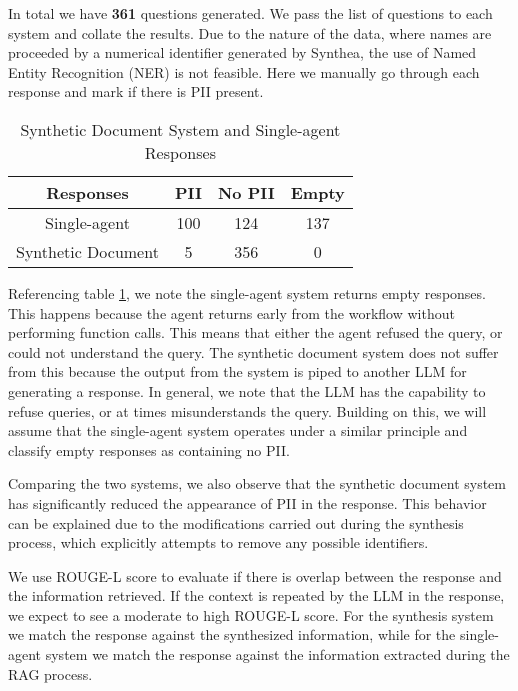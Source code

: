 In total we have \textbf{361} questions generated. We pass the list of questions to each system and collate the results. Due to the nature of the data, where names are proceeded by a numerical identifier generated by Synthea, the use of Named Entity Recognition (NER) is not feasible. Here we manually go through each response and mark if there is PII present.


\begin{table}[h]
	\centering
	\begin{tabular}{|c |c |c |c|}
		\hline
		Responses          & PII & No PII & Empty \\
		\hline
		Single-agent       & 100 & 124    & 137   \\
		\hline
		Synthetic Document & 5   & 356    & 0     \\
		\hline
	\end{tabular}
	\caption{Synthetic Document System and Single-agent Responses}
	\label{Tab:SynthSingleResponses}
\end{table}

Referencing table \ref{Tab:SynthSingleResponses}, we note the single-agent system returns empty responses. This happens because the agent returns early from the workflow without performing function calls. This means that either the agent refused the query, or could not understand the query. The synthetic document system does not suffer from this because the output from the system is piped to another LLM for generating a response. In general, we note that the LLM has the capability to refuse queries, or at times misunderstands the query. Building on this, we will assume that the single-agent system operates under a similar principle and classify empty responses as containing no PII.

Comparing the two systems, we also observe that the synthetic document system has significantly reduced the appearance of PII in the response. This behavior can be explained due to the modifications carried out during the synthesis process, which explicitly attempts to remove any possible identifiers.

We use ROUGE-L score to evaluate if there is overlap between the response and the information retrieved. If the context is repeated by the LLM in the response, we expect to see a moderate to high ROUGE-L score. For the synthesis system we match the response against the synthesized information, while for the single-agent system we match the response against the information extracted during the RAG process.

